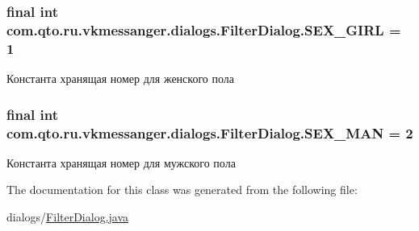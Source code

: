\subsubsection[{S\+E\+X\+\_\+\+G\+I\+R\+L}]{\setlength{\rightskip}{0pt plus 5cm}final int com.\+qto.\+ru.\+vkmessanger.\+dialogs.\+Filter\+Dialog.\+S\+E\+X\+\_\+\+G\+I\+R\+L = 1\hspace{0.3cm}{\ttfamily [static]}}\label{classcom_1_1qto_1_1ru_1_1vkmessanger_1_1dialogs_1_1_filter_dialog_a755c89b25499a16bcd8505e6f1a74ccc}
Константа хранящая номер для женского пола \hypertarget{classcom_1_1qto_1_1ru_1_1vkmessanger_1_1dialogs_1_1_filter_dialog_a968ac6ce9f09963329e15ceae0cfa275}{}
\subsubsection[{S\+E\+X\+\_\+\+M\+A\+N}]{\setlength{\rightskip}{0pt plus 5cm}final int com.\+qto.\+ru.\+vkmessanger.\+dialogs.\+Filter\+Dialog.\+S\+E\+X\+\_\+\+M\+A\+N = 2\hspace{0.3cm}{\ttfamily [static]}}\label{classcom_1_1qto_1_1ru_1_1vkmessanger_1_1dialogs_1_1_filter_dialog_a968ac6ce9f09963329e15ceae0cfa275}
Константа хранящая номер для мужского пола 

The documentation for this class was generated from the following file\+:\begin{DoxyCompactItemize}
\item 
dialogs/\hyperlink{_filter_dialog_8java}{Filter\+Dialog.\+java}\end{DoxyCompactItemize}
